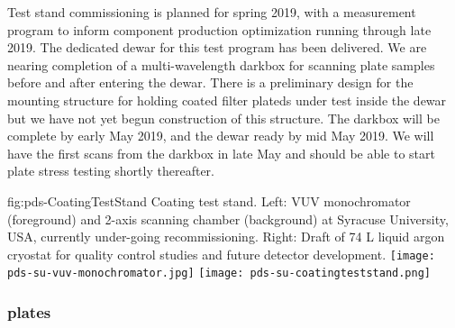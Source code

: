 

 Test stand commissioning is planned for spring 2019, with a measurement program to inform component production optimization running through late 2019.  The dedicated dewar for this test program has been delivered. We are nearing completion of a multi-wavelength darkbox for scanning plate samples before and after entering the dewar. There is a preliminary design for the mounting structure for holding coated filter plateds under test inside the dewar but we have not yet begun construction of this structure. The darkbox will be complete by early May 2019, and the dewar ready by mid May 2019. We will have the first scans from the darkbox in late May and should be able to start plate stress testing shortly thereafter.
 

\begin{dunefigure}
 {fig:pds-CoatingTestStand}
 { Coating test stand. Left: VUV monochromator (foreground) and 2-axis scanning chamber (background) at Syracuse University, USA, currently under-going recommissioning. Right: Draft of 74 L liquid argon cryostat for quality control studies and future detector development.}
\texttt{[image: pds-su-vuv-monochromator.jpg]}
\hspace{0.02\textwidth}
\texttt{[image: pds-su-coatingteststand.png]}
\end{dunefigure}



\subsubsection{ plates}

